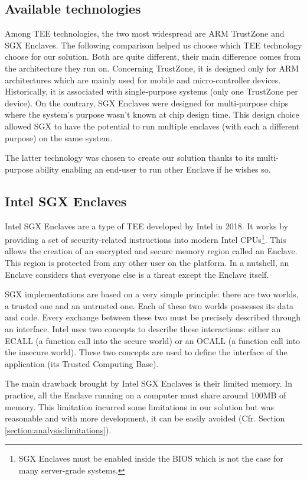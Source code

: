 \documentclass[../main.tex]{subfiles}
\begin{document}
\subsection{Available technologies}
\label{section:theoric:tee_trustzone_vs_sgx}
\par Among TEE technologies, the two most widespread are ARM TrustZone and SGX Enclaves. The following comparison helped us choose which TEE technology choose for our solution. Both are quite different, their main difference comes from the architecture they run on. Concerning TrustZone, it is designed only for ARM architectures which are mainly used for mobile and micro-controller devices. Historically, it is associated with single-purpose systems (only one TrustZone per device). On the contrary, SGX Enclaves were designed for multi-purpose chips where the system's purpose wasn't known at chip design time. This design choice allowed SGX to have the potential to run multiple enclaves (with each a different purpose) on the same system.
\par The latter technology was chosen to create our solution thanks to its multi-purpose ability enabling an end-user to run other Enclave if he wishes so.


\subsection{Intel SGX Enclaves}
\label{section:theoric:intel_sgx}
\par Intel SGX Enclaves are a type of TEE developed by Intel in 2018. It works by providing a set of security-related instructions into modern Intel CPUs\footnote{SGX Enclaves must be enabled inside the BIOS which is not the case for many server-grade systems.}. This allows the creation of an encrypted and secure memory region called an Enclave. This region is protected from any other user on the platform. In a nutshell, an Enclave considers that everyone else is a threat except the Enclave itself.
\par SGX implementations are based on a very simple principle: there are two worlds, a trusted one and an untrusted one.  Each of these two worlds possesses its data and code. Every exchange between these two must be precisely described through an interface. Intel uses two concepts to describe these interactions: either an ECALL (a function call into the secure world) or an OCALL (a function call into the insecure world). These two concepts are used to define the interface of the application (its Trusted Computing Base).
\par The main drawback brought by Intel SGX Enclaves is their limited memory. In practice, all the Enclave running on a computer must share around 100MB of memory. This limitation incurred some limitations in our solution but was reasonable and with more development, it can be easily avoided (Cfr. Section \ref{section:analysis:limitations}).
\end{document}
